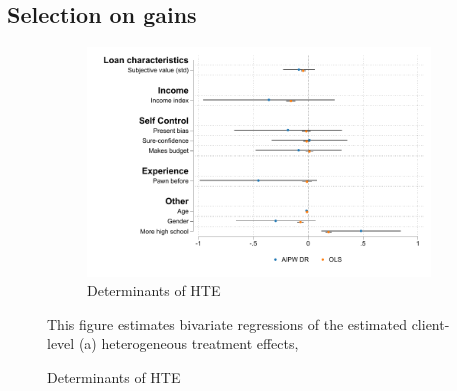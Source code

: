 \subsection{Selection on gains}

\begin{figure}[H]
    \caption{Determinants of treatment effects and probability of choosing commitment}
    \label{determinants_ps_hte}
    \begin{center}
    \begin{subfigure}{0.65\textwidth}
        \caption{Determinants of HTE}
        \centering
        \includegraphics[width=\textwidth]{Figuras/HE/he_int_vertical_apr_pro_2.pdf}
    \end{subfigure}
  
    \end{center}
     \scriptsize   This figure estimates bivariate regressions of the estimated client-level (a) heterogeneous treatment effects, %
\end{figure}


